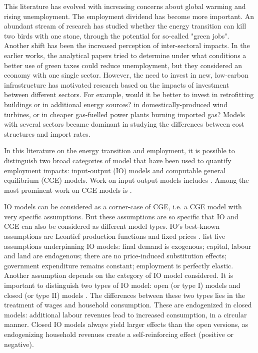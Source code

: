 This literature has evolved with increasing concerns about global warming and rising unemployment. The employment dividend has become more important. An abundant stream of research has studied whether the energy transition can kill two birds with one stone, through the potential for so-called "green jobs".
Another shift has been the increased perception of inter-sectoral impacts.
In the earlier works, the analytical papers \citep{Bovenberg1994, Bovenberg1996} tried to determine under what conditions a better use of green taxes could reduce unemployment, but they considered an economy with one single sector.
However, the need to invest in new, low-carbon infrastructure has motivated research based on the impacts of investment between different sectors. For example, would it be better to invest in retrofitting buildings or in additional energy sources? in domestically-produced wind turbines, or in cheaper gas-fuelled power plants burning imported gas? 
Models with several sectors became dominant in studying the differences between cost structures and import rates.

In this literature on the energy transition and employment, it is possible to distinguish two broad categories of model that have been used to quantify employment impacts: input-output (IO) models and computable general equilibrium (CGE) models.
Work on input-output models includes \citet{Hillebrand2006, Scott2008, deArce2012, Markaki2013, Hartwig2016, Yushchenko2016, Li2016, Garrett2017}.
Among the most prominent work on CGE models is \citet{Lehr2008, Lehr2012, Bohringer2013, Blazejczak2014, Creutzig2014, Duscha2014, Duscha2016}.

IO models can be considered as a corner-case of CGE, i.e. a CGE model with very specific assumptions. But these assumptions are so specific that IO and CGE can also be considered as different model types. IO's best-known assumptions are Leontief production functions and fixed prices \citep{Miller2009}. \citet{Dwyer2005} list five assumptions underpinning IO models: final demand is exogenous; capital, labour and land are endogenous; there are no price-induced substitution effects; government expenditure remains constant; employment is perfectly elastic. 
Another assumption depends on the category of IO model considered. It is important to distinguish two types of IO model: open (or type I) models and closed (or type II) models \citep{Miller2009}. The differences between these two types lies in the treatment of wages and household consumption. These are endogenized in closed models: additional labour revenues lead to increased consumption, in a circular manner. Closed IO models always yield larger effects than the open versions, as endogenizing household revenues create a self-reinforcing effect (positive or negative).

